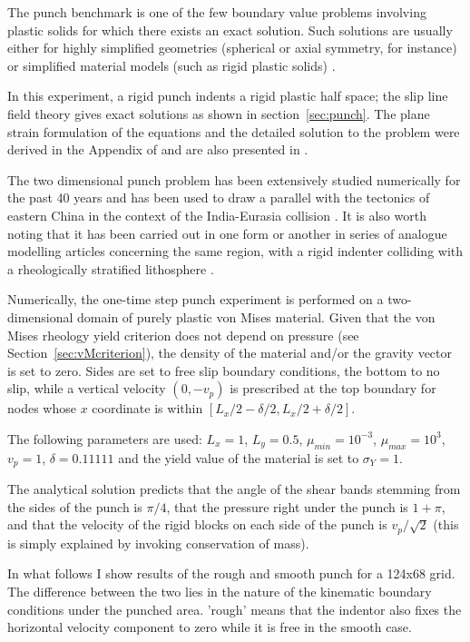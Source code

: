 The punch benchmark is one of the few boundary value problems involving plastic solids for which there exists an exact solution. 
Such solutions are usually either for highly simplified geometries (spherical or axial symmetry, for instance) or simplified material models (such as rigid plastic solids) \cite{kacha04}.

In this experiment, a rigid punch indents a rigid plastic half space; the slip line field theory gives 
exact solutions as shown in section~\ref{sec:punch}. 
The plane strain formulation of the equations and the detailed solution to the problem were derived in the Appendix of \cite{thfb08} and are also presented in \cite{gepd98}.

The two dimensional punch problem has been extensively studied numerically for the past 40 years 
\cite{zihl75,zihp95,chpe01,chan99,huhy99,yuti06,bufs08,raab07} and has been used to draw a parallel 
with the tectonics of eastern China in the context of the 
India-Eurasia collision \cite{tamo76,mota77}.
It is also worth noting that it has been carried out in one form or another in series of 
analogue modelling articles 
concerning the same region, with a rigid indenter colliding with a rheologically stratified 
lithosphere \cite{peta88,daco88,jodc90}.
 
Numerically, the one-time step punch experiment is performed on a two-dimensional
domain of purely plastic von Mises material. 
Given that the von Mises rheology yield criterion does not depend on pressure
(see Section~\ref{sec:vMcriterion}), the density of the material and/or the gravity 
vector is set to zero. Sides are set to free slip boundary conditions, the bottom to no slip, 
while a vertical velocity $(0,-v_p)$ is prescribed at the top boundary for nodes 
whose $x$ coordinate is within $[L_x/2-\delta/2,L_x/2+\delta/2]$. 

The following parameters are used: $L_x=1$, $L_y=0.5$, $\mu_{min}=10^{-3}$, 
$\mu_{max}=10^3$, $v_p=1$, $\delta=0.11111$ 
and the yield value of the material is set to $\sigma_Y=1$. 

The analytical solution predicts that the angle of the shear bands stemming from the sides of the punch 
is $\pi/4$, that the pressure right under the punch is $1+\pi$, 
and that the velocity of the rigid blocks on each side of the punch is $v_p/\sqrt{2}$ 
(this is simply explained by invoking conservation of mass).

In what follows I show results of the rough and smooth punch for a 124x68 grid. The difference between the two
lies in the nature of the kinematic boundary conditions under the punched area. 'rough' means that the indentor 
also fixes the horizontal velocity component to zero while it is free in the smooth case.

